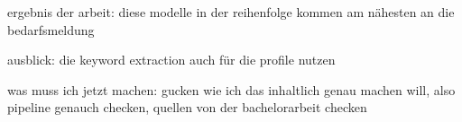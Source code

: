 \documentclass[a4paper,12pt]{scrreprt}
\begin{document}
ergebnis der arbeit: diese modelle in der reihenfolge kommen am nähesten an die bedarfsmeldung

ausblick: die keyword extraction auch für die profile nutzen 

was muss ich jetzt machen: gucken wie ich das inhaltlich genau machen will, also pipeline genauch checken, quellen von der bachelorarbeit checken











%







%
%
\raggedright
\printbibliography
\end{document}
